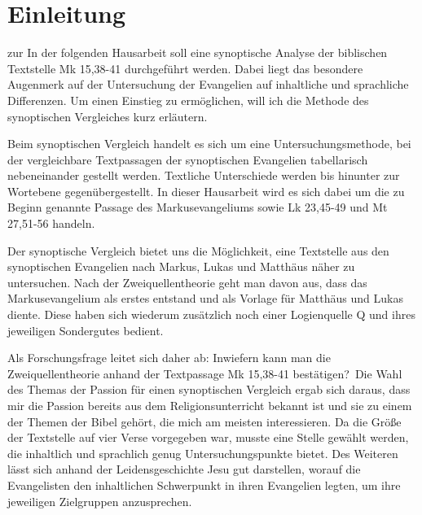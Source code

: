 \section{Einleitung}zur 
In der folgenden Hausarbeit soll eine synoptische Analyse der biblischen Textstelle Mk 15,38-41 durchgeführt werden. Dabei liegt das besondere Augenmerk auf der Untersuchung der Evangelien auf inhaltliche und sprachliche Differenzen. Um einen Einstieg zu ermöglichen, will ich die Methode des synoptischen Vergleiches kurz erläutern.

Beim synoptischen Vergleich handelt es sich um eine Untersuchungsmethode, bei der vergleichbare Textpassagen der synoptischen Evangelien tabellarisch nebeneinander gestellt werden. Textliche Unterschiede werden bis hinunter zur Wortebene gegenübergestellt. In dieser Hausarbeit wird es sich dabei um die zu Beginn genannte Passage des Markusevangeliums sowie Lk 23,45-49 und Mt 27,51-56 handeln.

Der synoptische Vergleich bietet uns die Möglichkeit, eine Textstelle aus den synoptischen Evangelien nach Markus, Lukas und Matthäus näher zu untersuchen. Nach der Zweiquellentheorie geht man davon aus, dass das Markusevangelium als erstes entstand und als Vorlage für Matthäus und Lukas diente. Diese haben sich wiederum zusätzlich noch einer Logienquelle Q und ihres jeweiligen Sondergutes bedient.

Als Forschungsfrage leitet sich daher ab: \glqq Inwiefern kann man die Zweiquellentheorie anhand der Textpassage Mk 15,38-41 bestätigen?\grqq\
Die Wahl des Themas der Passion für einen synoptischen Vergleich ergab sich daraus, dass mir die Passion bereits aus dem Religionsunterricht bekannt ist und sie zu einem der Themen der Bibel gehört, die mich am meisten interessieren. Da die Größe der Textstelle auf vier Verse vorgegeben war, musste eine Stelle gewählt werden, die inhaltlich und sprachlich genug Untersuchungspunkte bietet. Des Weiteren lässt sich anhand der Leidensgeschichte Jesu gut darstellen, worauf die Evangelisten den inhaltlichen Schwerpunkt in ihren Evangelien legten, um ihre jeweiligen Zielgruppen anzusprechen.
